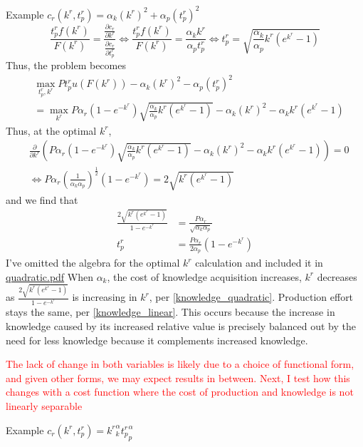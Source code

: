 \documentclass[source/paper/main.tex]{subfiles}
\begin{document}
Example $c_r(k^r, t_p^r) = \alpha_k (k^r)^2 + \alpha_p (t_p^r)^2$\\
$$\frac{t_p^r f(k^r) }{F(k^r)} = \frac{\frac{\partial c_r}{\partial k^r}}{\frac{\partial c_r}{\partial t_p^r}} \iff \frac{t_p^r f(k^r) }{F(k^r)} = \frac{\alpha_k k^r}{\alpha_p t_p^r} \iff t_p^r = \sqrt{\frac{\alpha_k}{\alpha_p} k^r (e^{k^r} - 1)} $$
Thus, the problem becomes
\begin{align*}
    &\max_{t_p^r, k^r} P  t_p^r  u(F(k^r)) - \alpha_k (k^r)^2 - \alpha_p (t_p^r)^2 \\
    &= \max_{k^r} P\alpha_r(1-e^{-k^r}) \sqrt{\frac{\alpha_k}{\alpha_p} k^r (e^{k^r} - 1)}  -\alpha_k (k^r)^2 - \alpha_k k^r (e^{k^r} - 1)
\end{align*}
Thus, at the optimal $k^r$, 
\begin{align*}
    &\frac{\partial }{\partial k^r} \left(P\alpha_r(1-e^{-k^r}) \sqrt{\frac{\alpha_k}{\alpha_p} k^r (e^{k^r} - 1)}  -\alpha_k (k^r)^2 - \alpha_k k^r (e^{k^r} - 1)\right) = 0 \\
    &\iff P \alpha_r \left(\frac{1}{\alpha_k \alpha_p}\right)^{\frac12 } (1 - e^{-k^r}) = 2 \sqrt{k^r (e^{k^r} - 1)}
\end{align*}
and we find that
\begin{align}
    \frac{2\sqrt{k^r(e^{k^r} - 1)}}{1-e^{-k^r}} &= \frac{P\alpha_r}{\sqrt{\alpha_k \alpha_p}} \label{knowledge_quadratic} \\
    t_p^r &= \frac{P\alpha_r}{2\alpha_p} (1-e^{-k^r}) \label{production_effort_quadratic}
\end{align}
I've omitted the algebra for the optimal $k^r$ calculation and included it in 
\href{run:source/paper/math/quadratic.pdf}{quadratic.pdf}
When $\alpha_k$, the cost of knowledge acquisition increases, $k^r$ decreases as $\frac{2\sqrt{k^r(e^{k^r} - 1)}}{1-e^{-k^r}}$ is increasing in $k^r$, per \ref{knowledge_quadratic}. Production effort stays the same, per \ref{knowledge_linear}. This occurs because the increase in knowledge caused by its increased relative value is precisely balanced out by the need for less knowledge because it complements increased knowledge. 

\textcolor{red}{The lack of change in both variables is likely due to a choice of functional form, and given other forms, we may expect results in between. Next, I test how this changes with a cost function where the cost of production and knowledge is not linearly separable}

Example $c_r(k^r, t_p^r) = {k^r}^\alpha_k {t_p^r}^\alpha_p $
\end{document}
